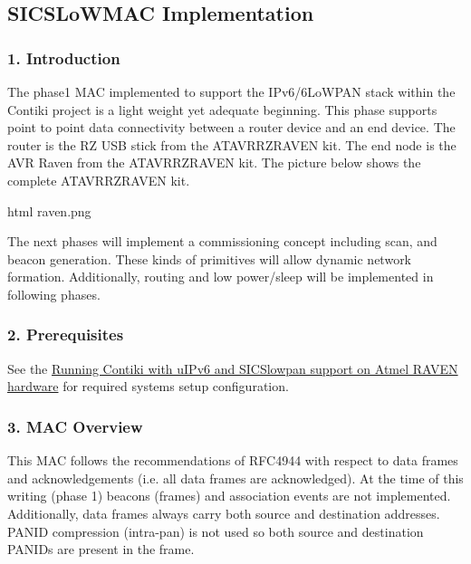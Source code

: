 \hypertarget{a00069}{}\subsection{S\+I\+C\+S\+Lo\+W\+M\+AC Implementation}
\label{a00069}
\hypertarget{a00069_macintro}{}\subsubsection{1. Introduction}\label{a00069_macintro}
The phase1 M\+AC implemented to support the I\+Pv6/6\+Lo\+W\+P\+AN stack within the Contiki project is a light weight yet adequate beginning. This phase supports point to point data connectivity between a router device and an end device. The router is the RZ U\+SB stick from the A\+T\+A\+V\+R\+R\+Z\+R\+A\+V\+EN kit. The end node is the A\+VR Raven from the A\+T\+A\+V\+R\+R\+Z\+R\+A\+V\+EN kit. The picture below shows the complete A\+T\+A\+V\+R\+R\+Z\+R\+A\+V\+EN kit. \begin{DoxyVerb}\image html raven.png
\end{DoxyVerb}


The next phases will implement a commissioning concept including scan, and beacon generation. These kinds of primitives will allow dynamic network formation. Additionally, routing and low power/sleep will be implemented in following phases.\hypertarget{a00069_macprereqs}{}\subsubsection{2. Prerequisites}\label{a00069_macprereqs}
See the \hyperlink{a00072}{Running Contiki with u\+I\+Pv6 and S\+I\+C\+Slowpan support on Atmel R\+A\+V\+EN hardware} for required systems setup configuration.\hypertarget{a00069_macoverview}{}\subsubsection{3. M\+A\+C Overview}\label{a00069_macoverview}
This M\+AC follows the recommendations of R\+F\+C4944 with respect to data frames and acknowledgements (i.\+e. all data frames are acknowledged). At the time of this writing (phase 1) beacons (frames) and association events are not implemented. Additionally, data frames always carry both source and destination addresses. P\+A\+N\+ID compression (intra-\/pan) is not used so both source and destination P\+A\+N\+ID\textquotesingle{}s are present in the frame.

